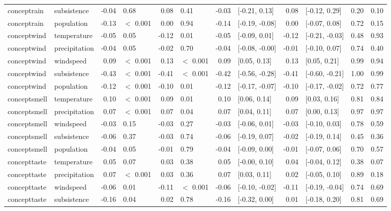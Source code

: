 \begin{table}[ht]
\begin{tabular}{llrlrlrlrlrr}
  conceptrain & subsistence & -0.04 & 0.68 & 0.08 & 0.41 & -0.03 & [-0.21, 0.13] & 0.08 & [-0.12, 0.29] & 0.20 & 0.10 \\ 
  conceptrain & population & -0.13 & $<$ 0.001 & 0.00 & 0.94 & -0.14 & [-0.19, -0.08] & 0.00 & [-0.07, 0.08] & 0.72 & 0.15 \\ 
  conceptwind & temperature & -0.05 & 0.05 & -0.12 & 0.01 & -0.05 & [-0.09, 0.01] & -0.12 & [-0.21, -0.03] & 0.48 & 0.93 \\ 
  conceptwind & precipitation & -0.04 & 0.05 & -0.02 & 0.70 & -0.04 & [-0.08, -0.00] & -0.01 & [-0.10, 0.07] & 0.74 & 0.40 \\ 
  conceptwind & windspeed & 0.09 & $<$ 0.001 & 0.13 & $<$ 0.001 & 0.09 & [0.05, 0.13] & 0.13 & [0.05, 0.21] & 0.99 & 0.94 \\ 
  conceptwind & subsistence & -0.43 & $<$ 0.001 & -0.41 & $<$ 0.001 & -0.42 & [-0.56, -0.28] & -0.41 & [-0.60, -0.21] & 1.00 & 0.99 \\ 
  conceptwind & population & -0.12 & $<$ 0.001 & -0.10 & 0.01 & -0.12 & [-0.17, -0.07] & -0.10 & [-0.17, -0.02] & 0.72 & 0.77 \\ 
  conceptsmell & temperature & 0.10 & $<$ 0.001 & 0.09 & 0.01 & 0.10 & [0.06, 0.14] & 0.09 & [0.03, 0.16] & 0.81 & 0.84 \\ 
  conceptsmell & precipitation & 0.07 & $<$ 0.001 & 0.07 & 0.04 & 0.07 & [0.04, 0.11] & 0.07 & [0.00, 0.13] & 0.97 & 0.97 \\ 
  conceptsmell & windspeed & -0.03 & 0.15 & -0.03 & 0.27 & -0.03 & [-0.06, 0.01] & -0.03 & [-0.10, 0.03] & 0.78 & 0.59 \\ 
  conceptsmell & subsistence & -0.06 & 0.37 & -0.03 & 0.74 & -0.06 & [-0.19, 0.07] & -0.02 & [-0.19, 0.14] & 0.45 & 0.36 \\ 
  conceptsmell & population & -0.04 & 0.05 & -0.01 & 0.79 & -0.04 & [-0.09, 0.00] & -0.01 & [-0.07, 0.06] & 0.70 & 0.57 \\ 
  concepttaste & temperature & 0.05 & 0.07 & 0.03 & 0.38 & 0.05 & [-0.00, 0.10] & 0.04 & [-0.04, 0.12] & 0.38 & 0.07 \\ 
  concepttaste & precipitation & 0.07 & $<$ 0.001 & 0.03 & 0.36 & 0.07 & [0.03, 0.11] & 0.02 & [-0.05, 0.10] & 0.89 & 0.18 \\ 
  concepttaste & windspeed & -0.06 & 0.01 & -0.11 & $<$ 0.001 & -0.06 & [-0.10, -0.02] & -0.11 & [-0.19, -0.04] & 0.74 & 0.69 \\ 
  concepttaste & subsistence & -0.16 & 0.04 & 0.02 & 0.78 & -0.16 & [-0.32, 0.00] & 0.01 & [-0.18, 0.20] & 0.81 & 0.69 \\ 

\end{tabular}
\end{table}
